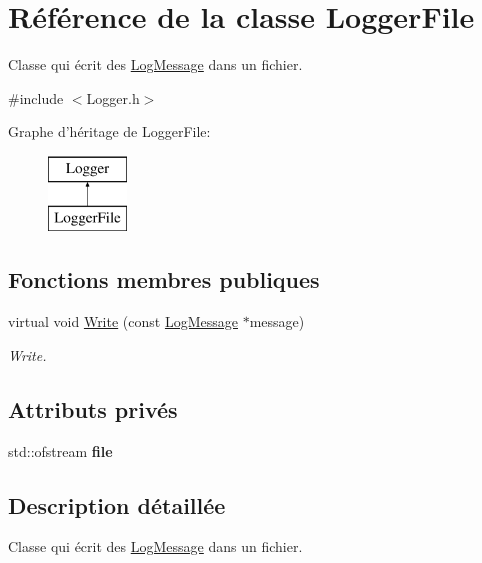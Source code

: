 \hypertarget{class_logger_file}{\section{Référence de la classe Logger\-File}
\label{class_logger_file}
}


Classe qui écrit des \hyperlink{class_log_message}{Log\-Message} dans un fichier.  




{\ttfamily \#include $<$Logger.\-h$>$}

Graphe d'héritage de Logger\-File\-:\begin{figure}[H]
\begin{center}
\leavevmode
\includegraphics[height=2.000000cm]{class_logger_file}
\end{center}
\end{figure}
\subsection*{Fonctions membres publiques}
\begin{DoxyCompactItemize}
\item 
virtual void \hyperlink{class_logger_file_a010eb0025beb001f6c5b81adad572d21}{Write} (const \hyperlink{class_log_message}{Log\-Message} $\ast$message)
\begin{DoxyCompactList}\small\item\em Write. \end{DoxyCompactList}\end{DoxyCompactItemize}
\subsection*{Attributs privés}
\begin{DoxyCompactItemize}
\item 
\hypertarget{class_logger_file_ab75bdc48690f9cfbd17a7c70bbfe1114}{std\-::ofstream {\bfseries file}}\label{class_logger_file_ab75bdc48690f9cfbd17a7c70bbfe1114}

\end{DoxyCompactItemize}


\subsection{Description détaillée}
Classe qui écrit des \hyperlink{class_log_message}{Log\-Message} dans un fichier. 

